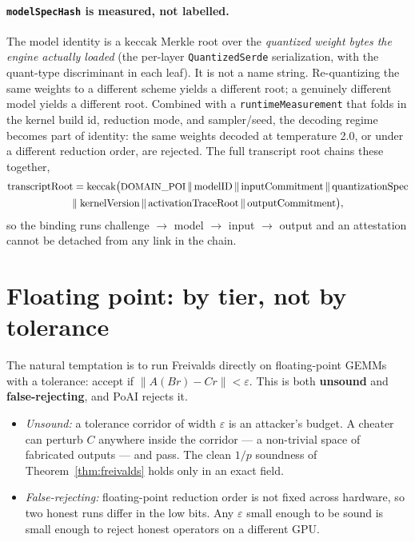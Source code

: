 \documentclass[11pt]{article}
\newcommand{\keccak}{\ensuremath{\mathrm{keccak}}}
\newcommand{\code}[1]{\texttt{#1}}
\begin{document}
\paragraph{\code{modelSpecHash} is measured, not labelled.} The model identity
is a \keccak{} Merkle root over the \emph{quantized weight bytes the engine
actually loaded} (the per-layer \code{QuantizedSerde} serialization, with the
quant-type discriminant in each leaf). It is not a name string. Re-quantizing the
same weights to a different scheme yields a different root; a genuinely different
model yields a different root. Combined with a \code{runtimeMeasurement} that
folds in the kernel build id, reduction mode, and sampler/seed, the decoding
regime becomes part of identity: the same weights decoded at temperature 2.0, or
under a different reduction order, are rejected. The full transcript root chains
these together,
\begin{multline*}
\text{transcriptRoot} = \keccak\big(\text{\small DOMAIN\_POI} \,\|\,
  \text{modelID} \,\|\, \text{inputCommitment} \,\|\,
  \text{quantizationSpec} \\
  \|\; \text{kernelVersion} \,\|\,
  \text{activationTraceRoot} \,\|\, \text{outputCommitment}\big),
\end{multline*}
so the binding runs challenge $\to$ model $\to$ input $\to$ output and an
attestation cannot be detached from any link in the chain.

\section{Floating point: by tier, not by tolerance}
\label{sec:fp}

The natural temptation is to run Freivalds directly on floating-point GEMMs with
a tolerance: accept if $\lVert A(Br) - Cr\rVert < \varepsilon$. This is both
\textbf{unsound} and \textbf{false-rejecting}, and PoAI rejects it.

\begin{itemize}[leftmargin=1.4em]
  \item \emph{Unsound:} a tolerance corridor of width $\varepsilon$ is an
        attacker's budget. A cheater can perturb $C$ anywhere inside the corridor
        --- a non-trivial space of fabricated outputs --- and pass. The clean
        $1/p$ soundness of Theorem~\ref{thm:freivalds} holds only in an exact
        field.
  \item \emph{False-rejecting:} floating-point reduction order is not fixed
        across hardware, so two honest runs differ in the low bits. Any
        $\varepsilon$ small enough to be sound is small enough to reject honest
        operators on a different GPU.
\end{itemize}
\end{document}
